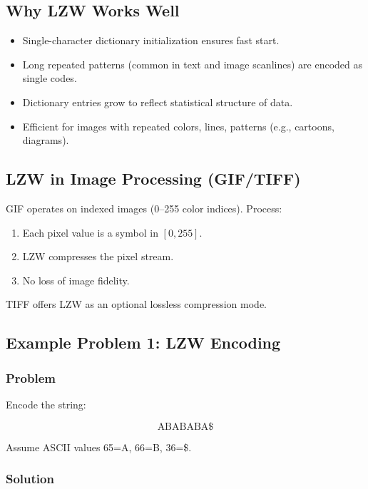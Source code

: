 \documentclass{AnantDocumentation}
\begin{document}
\subsection{Why LZW Works Well}

\begin{itemize}
\item Single-character dictionary initialization ensures fast start.
\item Long repeated patterns (common in text and image scanlines) are encoded as single codes.
\item Dictionary entries grow to reflect statistical structure of data.
\item Efficient for images with repeated colors, lines, patterns (e.g., cartoons, diagrams).
\end{itemize}

\subsection{LZW in Image Processing (GIF/TIFF)}

GIF operates on indexed images (0–255 color indices).  
Process:

\begin{enumerate}
\item Each pixel value is a symbol in \([0,255]\).
\item LZW compresses the pixel stream.
\item No loss of image fidelity.
\end{enumerate}

TIFF offers LZW as an optional lossless compression mode.

\subsection{Example Problem 1: LZW Encoding}

\subsubsection*{Problem}

Encode the string:

\[
\text{ABABABA\$}
\]

Assume ASCII values 65=A, 66=B, 36=\$.

\subsubsection*{Solution}
\end{document}
